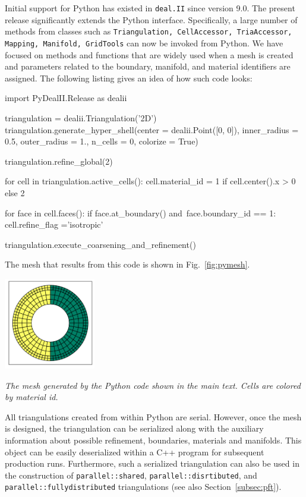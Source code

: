 \documentclass{ansarticle-preprint}
\newcommand{\specialword}[1]{\texttt{#1}}
\newcommand{\dealii}{{\specialword{deal.II}}\xspace}
\begin{document}
Initial support for Python has existed in \dealii{} since version
9.0. The present release significantly extends the Python
interface. Specifically, a large number of methods from classes such
as \texttt{Triangulation, CellAccessor, TriaAccessor, Mapping,
  Manifold, GridTools} can now be invoked from Python. We have focused
on methods and functions that are widely used when a mesh is created
and parameters related to the boundary, manifold, and material
identifiers are assigned. The following listing gives an idea of how
such code looks:
\begin{python}
  import PyDealII.Release as dealii

  triangulation = dealii.Triangulation('2D')
  triangulation.generate_hyper_shell(center = dealii.Point([0, 0]),
  inner_radius = 0.5, outer_radius = 1.,
  n_cells = 0, colorize = True)

  triangulation.refine_global(2)

  for cell in triangulation.active_cells():
  cell.material_id = 1 if cell.center().x > 0 else 2

  for face in cell.faces():
  if face.at_boundary() and\
  face.boundary_id == 1:
  cell.refine_flag ='isotropic'

  triangulation.execute_coarsening_and_refinement()
\end{python}
The mesh that results from this code is shown in Fig.~\ref{fig:pymesh}.

\begin{floatingfigure}[r]{0.3\textwidth}
  \centering
  \vspace*{-1.4cm}
  \includegraphics[width=0.3\textwidth]{python_mesh.png}
  \vspace*{-5mm}
  \caption{\it The mesh generated by the Python code shown in the main
    text. Cells are colored by material id.}
  \vspace*{0.2cm}
  \label{fig:pymesh}
\end{floatingfigure}
All triangulations created from within Python are serial. However,
once the mesh is designed, the triangulation can be serialized along
with the auxiliary information about possible refinement, boundaries,
materials and manifolds. This object can be easily deserialized within
a C++ program for subsequent production runs. Furthermore, such a
serialized triangulation can also be used in the construction of
\texttt{parallel::shared}, \texttt{parallel::disrtibuted}, and
\texttt{parallel::fullydistributed} triangulations (see also Section~\ref{subsec:pft}).
\end{document}
